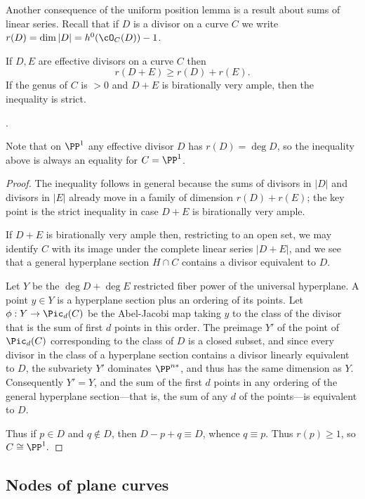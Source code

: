 Another consequence of the uniform position lemma is a result about sums of linear series.
Recall that if $D$ is a divisor on a curve $C$ we write $r(D) = \dim |D| = h^0(\cO_C(D))-1$.

\begin{corollary}\label{Clifford equality plus}
If $D,E$ are effective divisors on a curve $C$ then
$$
r(D+E) \geq r(D)+r(E).
$$
If the genus of $C$ is $>0$ and $D+E$ is birationally very ample, then the inequality is strict.
\end{corollary}.

Note that on $\PP^1$ any effective divisor $D$ has $r(D) = \deg D$, so the inequality above is
always an equality for $C = \PP^1$.

\begin{proof}
 The inequality follows in general because the sums of divisors in $|D|$ and divisors in $|E|$ already move in 
 a family of dimension $r(D)+r(E)$; the key point is the strict inequality in case $D+E$ is birationally very ample.
 
If $D+E$ is birationally very ample then, restricting to an open set,
we may identify $C$ with its image under the complete linear series $|D+E|$, and we see that a general hyperplane section $H\cap C$ contains a divisor equivalent to $D$.

Let $Y$ be the $\deg D +\deg E$ restricted fiber power of the universal hyperplane.
A point $y\in Y$ is a hyperplane section plus an ordering of its points.  Let $\phi: Y \to \Pic_d(C)$ be the Abel-Jacobi map taking $y$
 to the class of the divisor that is the sum of first $d$ points in this order. The preimage  $Y'$ of the point of $\Pic_d(C)$ corresponding to the class of $D$ is a closed subset, and
since every divisor in the class of a hyperplane section contains a divisor
linearly equivalent to  $D$, the subvariety $Y'$ dominates $\PP^{n*}$, and thus
has the same dimension as $Y$. Consequently $Y'=Y$, and the sum of the first $d$ points
in any ordering of the general hyperplane section---that is, the sum of any $d$
of the points---is equivalent to $D$.

Thus if $p\in D$ and $q\notin D$, then $D-p+q \equiv D$, whence $q\equiv p$. Thus
$r(p)\geq 1$, so $C\cong \PP^1.$
\end{proof}

\subsection{Nodes of plane curves}\label{plane curve nodes}

